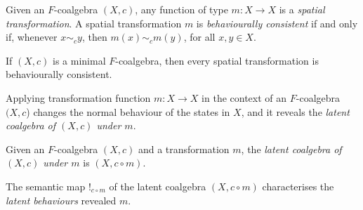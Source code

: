 \begin{definition}
Given an $F$-coalgebra $(X,c)$, any function of type $m\colon X\rightarrow X$ is a \emph{spatial transformation}. %
A spatial transformation $m$ is \emph{behaviourally consistent} if and only if, whenever $x\sim_c y$, then $m(x)\sim_{c} m(y)$, for all $x,y \in X$. %
\end{definition}
\begin{corollary}
    If $(X,c)$ is a minimal $F$-coalgebra, then every spatial transformation %
    is behaviourally consistent. %
\end{corollary}
Applying transformation function $m\colon X\rightarrow X$ in the context of an $F$-coalgebra $(X,c$) changes the normal behaviour of the states in $X$, and it reveals the \emph{latent coalgebra of $(X,c)$ under $m$}. 
\begin{definition}
Given an $F$-coalgebra $(X,c)$ and a transformation $m$, the \emph{latent coalgebra of $(X,c)$ under $m$} is $(X,c\circ m)$. 
\end{definition}
The semantic map $!_{c\circ m}$ %
of the latent coalgebra $(X,c\circ m)$ characterises the \emph{latent behaviours} revealed $m$. 

